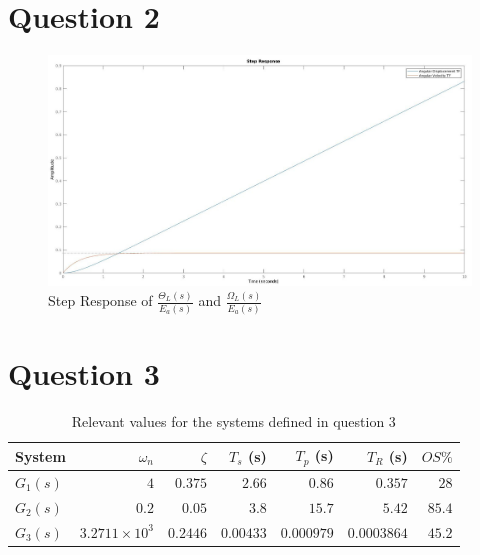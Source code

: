 \documentclass[a4paper, 12pt]{article}
\begin{document}
    \section{Question 2}

        

        \begin{figure}[!h]
            \centering
            \includegraphics[width=\textwidth]{q2.jpg}
            \caption{Step Response of $\frac{\Theta_L(s)}{E_a(s)}$ and $\frac{\Omega_L(s)}{E_a(s)}$}
            \label{fig:q2}
        \end{figure}

    \section{Question 3}

        
        \begin{table}[!h]
            \centering
            \caption{Relevant values for the systems defined in question 3}
            \label{tab:q3}
            \begin{tabular}{l|r|r|r|r|r|r}
                System & $\omega_n$ & $\zeta$ & $T_s$ (s) & $T_p$ (s) & $T_R$ (s) & $OS\%$ \\ 
                \hline
                $G_1(s)$ & $4$   & $0.375$ & $2.66$ & $0.86$ & $0.357$ & $28$ \\
                $G_2(s)$ & $0.2$ & $0.05$  & $3.8$  & $15.7$ & $5.42$  & $85.4$ \\
                $G_3(s)$ & $3.2711 \times 10^3$ & $0.2446$ & $0.00433$ & $0.000979$ & $0.0003864$ & $45.2$
                
            \end{tabular}
        \end{table}
\end{document}
